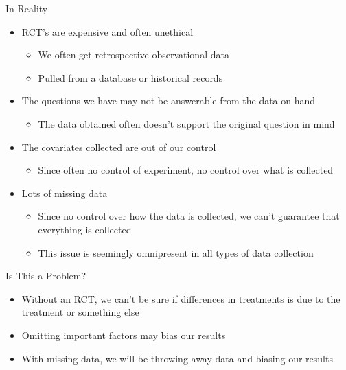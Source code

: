 \documentclass{beamer}
\begin{document}
\begin{frame}{In Reality}

  \begin{itemize}
   \item RCT's are expensive and often unethical
   \begin{itemize}
    \item We often get retrospective observational data
    \item Pulled from a database or historical records
   \end{itemize}

   \item The questions we have may not be answerable from the data on hand
   \begin{itemize}
    \item The data obtained often doesn't support the original question in mind
   \end{itemize}

   \item The covariates collected are out of our control
   \begin{itemize}
    \item Since often no control of experiment, no control over what is collected
   \end{itemize}

   \item Lots of missing data
   \begin{itemize}
    \item Since no control over how the data is collected, we can't guarantee that everything is collected
   \item This issue is seemingly omnipresent in all types of data collection
   \end{itemize}

  \end{itemize}

\end{frame}

\begin{frame}{Is This a Problem?}

  \begin{itemize}
   \item Without an RCT, we can't be sure if differences in treatments is due to the treatment or something else
   \item Omitting important factors may bias our results
   \item With missing data, we will be throwing away data and biasing our results
  \end{itemize}


\end{frame}
\end{document}
